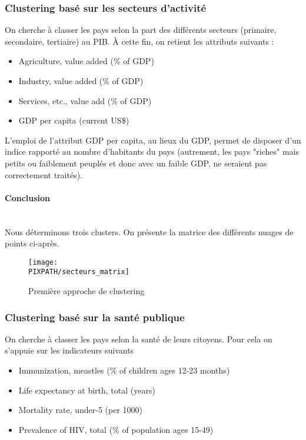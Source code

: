 \subsubsection{Clustering basé sur les secteurs d'activité}

On cherche à classer les pays selon la part des différents secteurs
(primaire, secondaire, tertiaire) au PIB. À cette fin, on retient les
attributs suivants :
\begin{itemize}
\item Agriculture, value added (\% of GDP)
\item Industry, value added (\% of GDP)
\item Services, etc., value add (\% of GDP)
\item GDP per capita (current US\$)
\end{itemize}

\vskip 6pt

L'emploi de l'attribut GDP per capita, au lieux du GDP, permet de disposer
d'un indice rapporté au nombre d'habitants du pays (autrement, les pays
"riches" mais petits ou faiblement peuplés et donc avec un faible GDP, ne
seraient pas correctement traités).

\paragraph{Conclusion}\hfill\\

Nous déterminons trois clusters. On présente la matrice des différents
nuages de points ci-après.

\begin{sidewaysfigure}[h]
\centering
\caption{Première approche de clustering}
\texttt{[image: \\PIXPATH/secteurs\_matrix]}
\end{sidewaysfigure}


\subsubsection{Clustering basé sur la santé publique}

On cherche à classer les pays selon la santé de leurs citoyens. Pour cela
on s'appuie sur les indicateurs suivants 

\begin{itemize}
\item Immunization, meastles (\% of children ages 12-23 months)
\item Life expectancy at birth, total (years)
\item Mortality rate, under-5 (per 1000)
\item Prevalence of HIV, total (\% of population ages 15-49)
\end{itemize}

